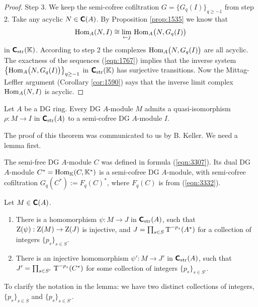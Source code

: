\begin{proof}
\medskip \noindent
Step 3. We keep the semi-cofree cofiltration 
$G = \{ G_q(I) \}_{q \geq -1}$ from step 2. 
Take any acyclic $N \in \operatorname{\boldsymbol{\mathsf{C}}}(A)$. By 
Proposition \ref{prop:1535} we know that 
\[ \operatorname{Hom}_{A}(N, I) \cong 
\lim_{\leftarrow j} \, \operatorname{Hom}_{A} \bigl( N, G_q(I) \bigr) \]
in $\boldsymbol{\mathsf{C}}_{\mathrm{str}}(\mathbb{K})$. According to step 2 the complexes 
$\operatorname{Hom}_{A} \bigl( N, G_q(I) \bigr)$ are all acyclic. 
The exactness of the sequences (\ref{eqn:1767}) implies that 
the inverse system \lb 
$\bigl\{ \operatorname{Hom}_{A} \bigl( N, G_q(I) \bigr) \bigr\}_{q \geq -1}$ 
in $\boldsymbol{\mathsf{C}}_{\mathrm{str}}(\mathbb{K})$ has surjective transitions. Now the 
Mittag-Leffler 
argument (Corollary \ref{cor:1590}) says that the inverse limit complex
$\operatorname{Hom}_{A}(N, I)$ is acyclic. 
\end{proof}

\begin{thm} \label{thm:3325}
Let $A$ be a DG ring. Every DG $A$-module $M$ admits a quasi-isomorphism
$\rho : M \to I$ in $\boldsymbol{\mathsf{C}}_{\mathrm{str}}(A)$ to a semi-cofree DG $A$-module 
$I$.
\end{thm}

The proof of this theorem was communicated to us by B. Keller. We need a lemma 
first.

The semi-free DG $A$-module $C$ was defined in formula (\ref{eqn:3307}). 
Its dual DG $A$-module $C^* = \operatorname{Hom}_{\mathbb{K}}(C, \mathbb{K}^*)$  
is a semi-cofree DG $A$-module, with semi-cofree cofiltration 
$G_q(C^*) := F_q(C)^*$,
where $F_q(C)$ is from (\ref{eqn:3332}). 

\begin{lem} \label{lem:3325}
Let $M \in \boldsymbol{\mathsf{C}}(A)$.
\begin{enumerate}
\item There is a homomorphism $\psi : M \to J$ 
in $\boldsymbol{\mathsf{C}}_{\mathrm{str}}(A)$, such that 
$\operatorname{Z}(\psi) : \operatorname{Z}(M) \to \operatorname{Z}(J)$ is injective,
and $J = \prod_{s \in S} \operatorname{T}^{-p_s}(A^*)$
for a collection of integers $\{ p_s \}_{s \in S}$. 

\item There is an injective homomorphism
$\psi' : M \to J'$ in $\boldsymbol{\mathsf{C}}_{\mathrm{str}}(A)$,
such that 
$J' = \prod_{s \in S'} \, \operatorname{T}^{-p_s}(C^*)$
for some collection of integers $\{ p_s \}_{s \in S'}$.
\end{enumerate}
\end{lem}

To clarify the notation in the lemma: we have two distinct collections 
of integers, $\{ p_s \}_{s \in S}$ and 
$\{ p_s \}_{s \in S'}$. 

